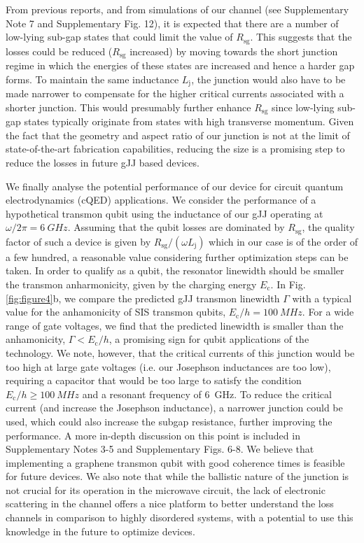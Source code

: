 From previous reports\cite{rosdahl_andreev_2018}, and from simulations of our channel (see Supplementary Note 7 and Supplementary Fig. 12), it is expected that there are a number of low-lying sub-gap states that could limit the value of $R_\text{sg}$.
This suggests that the losses could be reduced ($R_\text{sg}$ increased) by moving towards the short junction regime in which the energies of these states are increased and hence a harder gap forms.
To maintain the same inductance $L_\text{j}$, the junction would also have to be made narrower to compensate for the higher critical currents associated with a shorter junction.
This would presumably further enhance $R_\text{sg}$ since low-lying sub-gap states typically originate from states with high transverse momentum.
Given the fact that the geometry and aspect ratio of our junction is not at the limit of state-of-the-art fabrication capabilities, reducing the size is a promising step to reduce the losses in future gJJ based devices.

We finally analyse the potential performance of our device for circuit quantum electrodynamics (cQED) applications.
We consider the performance of a hypothetical transmon qubit \cite{koch_chargeinsensitive_2007} using the inductance of our gJJ operating at $\omega/2\pi=\SI{6}{GHz}$.
Assuming that the qubit losses are dominated by $R_\text{sg}$, the quality factor of such a device is given by $R_\text{sg}/(\omega L_\text{j})$ which in our case is of the order of a few hundred, a reasonable value considering further optimization steps can be taken.
In order to qualify as a qubit, the resonator linewidth should be smaller the transmon anharmonicity, given by the charging energy $E_\text{c}$.
In Fig. \ref{fig:figure4}b, we compare the predicted gJJ transmon linewidth $\Gamma$ with a typical value for the anhamonicity of SIS transmon qubits, $E_\text{c}/h = \SI{100}{MHz}$.
For a wide range of gate voltages, we find that the predicted linewidth is smaller than the anhamonicity, $\Gamma < E_\text{c}/h$, a promising sign for qubit applications of the technology.
We note, however, that the critical currents of this junction would be too high at large gate voltages (i.e. our Josephson inductances are too low), requiring a capacitor that would be too large to satisfy the condition $E_\text{c}/h \geq \SI{100}{MHz}$ and a resonant frequency of \SI{6}{GHz}.
To reduce the critical current (and increase the Josephson inductance), a narrower junction could be used, which could also increase the subgap resistance, further improving the performance.
A more in-depth discussion on this point is included in Supplementary Notes 3-5 and Supplementary Figs. 6-8.
We believe that implementing a graphene transmon qubit with good coherence times is feasible for future devices.
We also note that while the ballistic nature of the junction is not crucial for its operation in the microwave circuit, the lack of electronic scattering in the channel offers a nice platform to better understand the loss channels in comparison to highly disordered systems, with a potential to use this knowledge in the future to optimize devices. 

